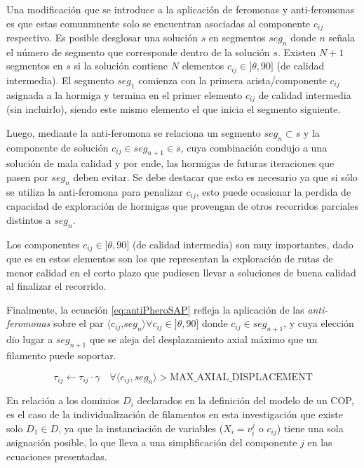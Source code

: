 Una modificaci\'on que se introduce a la aplicaci\'on de  feromonas y anti-feromonas es que estas comunmnente solo se encuentran asociadas al componente $c_{ij}$ respectivo. Es posible desglosar una soluci\'on $s$ en segmentos $seg_{n}$ donde $n$ se\~nala el n\'umero de segmento que corresponde dentro de la soluci\'on $s$. Existen $N + 1$ segmentos en $s$ si la soluci\'on contiene $N$ elementos $c_{ij} \in ]\theta, 90]$ (de calidad intermedia). El segmento $seg_1$ comienza con la primera arista/componente $c_{ij}$ asignada a la hormiga y termina en el primer elemento $c_{ij}$ de calidad intermedia (sin incluirlo), siendo este mismo elemento el que inicia el segmento siguiente.


Luego, mediante la anti-feromona se relaciona un segmento $seg_n \subset s$ y la componente de soluci\'on $c_{ij} \in seg_{n+1} \in s$, cuya combinaci\'on condujo a una soluci\'on de mala calidad y por ende, las hormigas de futuras iteraciones que pasen por $seg_n$ deben evitar. Se debe destacar que esto es necesario ya que si s\'olo se utiliza la anti-feromona para penalizar $c_{ij}$, esto puede ocasionar la perdida de capacidad de exploraci\'on de hormigas que provengan de otros recorridos parciales distintos a $seg_n$. 


Los componentes $c_{ij} \in ]\theta, 90]$ (de calidad intermedia) son muy importantes, dado que es en estos elementos son los que representan la exploraci\'on de rutas de menor calidad en el corto plazo que pudiesen llevar a soluciones de buena calidad al finalizar el recorrido.


Finalmente, la ecuaci\'on \eqref{eq:antiPheroSAP} refleja la aplicaci\'on de las {\it anti-feromonas} sobre el par $\langle c_{ij}$,$ seg_{n}\rangle \forall c_{ij} \in ]\theta, 90]$  donde $c_{ij} \in seg_{n+1}$, y cuya elecci\'on dio lugar a $seg_{n+1}$ que se aleja del desplazamiento axial m\'aximo que un filamento puede soportar.

\begin{equation}
    \label{eq:antiPheroSAP}
    \tau_{ij} \leftarrow \tau_{ij} \cdot \gamma \quad \forall \langle c_{ij},seg_{n}\rangle > \textrm{MAX\_AXIAL\_DISPLACEMENT}
\end{equation}

En relaci\'on a los dominios $D_i$ declarados en la definici\'on del modelo de un COP, es el caso de la individualizaci\'on de filamentos en esta investigaci\'on que existe solo $D_1 \in D$, ya que la instanciaci\'on de variables ($X_i = v_{i}^{j}$ o $c_{ij}$) tiene una sola asignaci\'on posible, lo que lleva a una simplificaci\'on del componente $j$ en las ecuaciones presentadas.

